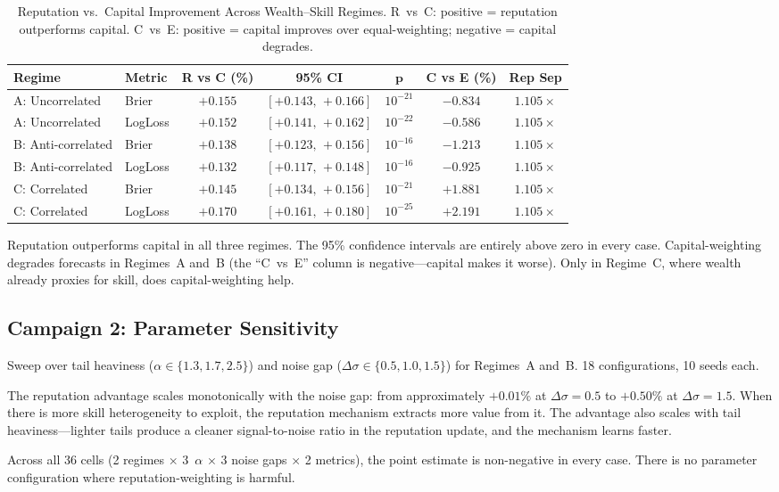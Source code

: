 \documentclass[9pt,oneside]{amsart}
\begin{document}
\begin{table}[h]
\centering
\small
\begin{tabular}{@{}llccccc@{}}
\toprule
\textbf{Regime} & \textbf{Metric} & \textbf{R vs C (\%)} & \textbf{95\% CI} & $\boldsymbol{p}$ & \textbf{C vs E (\%)} & \textbf{Rep Sep} \\
\midrule
A: Uncorrelated     & Brier   & $+0.155$ & $[+0.143,\, +0.166]$ & $10^{-21}$ & $-0.834$ & $1.105\times$ \\
A: Uncorrelated     & LogLoss & $+0.152$ & $[+0.141,\, +0.162]$ & $10^{-22}$ & $-0.586$ & $1.105\times$ \\
B: Anti-correlated  & Brier   & $+0.138$ & $[+0.123,\, +0.156]$ & $10^{-16}$ & $-1.213$ & $1.105\times$ \\
B: Anti-correlated  & LogLoss & $+0.132$ & $[+0.117,\, +0.148]$ & $10^{-16}$ & $-0.925$ & $1.105\times$ \\
C: Correlated       & Brier   & $+0.145$ & $[+0.134,\, +0.156]$ & $10^{-21}$ & $+1.881$ & $1.105\times$ \\
C: Correlated       & LogLoss & $+0.170$ & $[+0.161,\, +0.180]$ & $10^{-25}$ & $+2.191$ & $1.105\times$ \\
\bottomrule
\end{tabular}
\caption{Reputation vs.\ Capital Improvement Across Wealth--Skill Regimes. R~vs~C: positive = reputation outperforms capital. C~vs~E: positive = capital improves over equal-weighting; negative = capital degrades.}
\end{table}

\begin{multicols}{2}

Reputation outperforms capital in all three regimes. The 95\% confidence intervals are entirely above zero in every case. Capital-weighting degrades forecasts in Regimes~A and~B (the ``C~vs~E'' column is negative---capital makes it worse). Only in Regime~C, where wealth already proxies for skill, does capital-weighting help.

\subsection{Campaign 2: Parameter Sensitivity}

Sweep over tail heaviness ($\alpha \in \{1.3, 1.7, 2.5\}$) and noise gap ($\Delta\sigma \in \{0.5, 1.0, 1.5\}$) for Regimes~A and~B. 18 configurations, 10 seeds each.

The reputation advantage scales monotonically with the noise gap: from approximately $+0.01\%$ at $\Delta\sigma = 0.5$ to $+0.50\%$ at $\Delta\sigma = 1.5$. When there is more skill heterogeneity to exploit, the reputation mechanism extracts more value from it. The advantage also scales with tail heaviness---lighter tails produce a cleaner signal-to-noise ratio in the reputation update, and the mechanism learns faster.

Across all 36 cells (2 regimes $\times$ 3~$\alpha$ $\times$ 3 noise gaps $\times$ 2 metrics), the point estimate is non-negative in every case. There is no parameter configuration where reputation-weighting is harmful.

\end{multicols}
\end{document}
